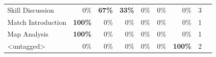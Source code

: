 \begin{table}[htbp]
\begin{tabular}{lrrrrrrrr}
    Skill Discussion                  & 0\%                                                                            & \textbf{67\%}                                                                      & \textbf{33\%}                                                                          & 0\%                                                                           & 0\%                                                                             & 0\%                                                                                                  & 3                                                                        \\
    Match Introduction                & \textbf{100\%}                                                                           & 0\%                                                                       & 0\%                                                                           & 0\%                                                                           & 0\%                                                                             & 0\%                                                                                                  & 1                                                                        \\
    Map Analysis                      & \textbf{100\%}                                                                           & 0\%                                                                       & 0\%                                                                           & 0\%                                                                           & 0\%                                                                             & 0\%                                                                                                  & 1                                                                        \\
    \textless{}untagged\textgreater{} & 0\%                                                                            & 0\%                                                                       & 0\%                                                                           & 0\%                                                                           & 0\%                                                                             & \textbf{100\%}                                                                                                & 2                                                                        \\
  \end{tabular}
\end{table}

\FloatBarrier
